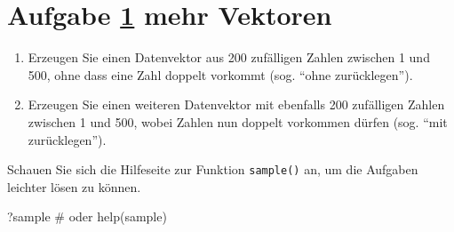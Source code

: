 \documentclass[
  11pt,
  a4paperpaper,
]{scrreprt}
\newenvironment{Shaded}{\begin{snugshade}}{\end{snugshade}}
\newcommand{\CommentTok}[1]{\textcolor[rgb]{0.37,0.37,0.37}{#1}}
\newcommand{\FunctionTok}[1]{\textcolor[rgb]{0.28,0.35,0.67}{#1}}
\newcommand{\NormalTok}[1]{\textcolor[rgb]{0.00,0.23,0.31}{#1}}
\begin{document}
\section{\texorpdfstring{Aufgabe \ref{sec-AAA02} mehr
Vektoren}{Aufgabe  mehr Vektoren}}\label{sec-AAA02}

\begin{tcolorbox}[enhanced jigsaw, arc=.35mm, breakable, left=2mm, opacityback=0, toprule=.15mm, bottomrule=.15mm, colback=white, colframe=quarto-callout-caution-color-frame, leftrule=.75mm, rightrule=.15mm]
\begin{minipage}[t]{5.5mm}
\textcolor{quarto-callout-caution-color}{\faFire}
\end{minipage}%
\begin{minipage}[t]{\textwidth - 5.5mm}

\begin{enumerate}
\def\labelenumi{\alph{enumi})}
\item
  Erzeugen Sie einen Datenvektor aus 200 zufälligen Zahlen zwischen 1
  und 500, ohne dass eine Zahl doppelt vorkommt (sog. ``ohne
  zurücklegen'').
\item
  Erzeugen Sie einen weiteren Datenvektor mit ebenfalls 200 zufälligen
  Zahlen zwischen 1 und 500, wobei Zahlen nun doppelt vorkommen dürfen
  (sog. ``mit zurücklegen'').
\end{enumerate}

\begin{tcolorbox}[enhanced jigsaw, arc=.35mm, breakable, left=2mm, opacityback=0, toprule=.15mm, bottomrule=.15mm, colback=white, colframe=quarto-callout-tip-color-frame, leftrule=.75mm, rightrule=.15mm]
\begin{minipage}[t]{5.5mm}
\textcolor{quarto-callout-tip-color}{\faLightbulb}
\end{minipage}%
\begin{minipage}[t]{\textwidth - 5.5mm}

Schauen Sie sich die Hilfeseite zur Funktion \texttt{sample()} an, um
die Aufgaben leichter lösen zu können.

\begin{Shaded}
\begin{Highlighting}[]
\NormalTok{?sample}
\CommentTok{\# oder}
\FunctionTok{help}\NormalTok{(sample)}
\end{Highlighting}
\end{Shaded}

\end{minipage}%
\end{tcolorbox}

\end{minipage}%
\end{tcolorbox}
\end{document}
